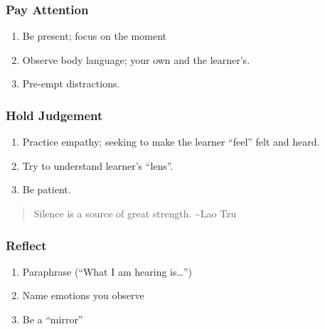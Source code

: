 \documentclass[
]{book}
\providecommand{\tightlist}{%
  \setlength{\itemsep}{0pt}\setlength{\parskip}{0pt}}
\begin{document}
\hypertarget{pay-attention}{%
\subsubsection*{Pay Attention}\label{pay-attention}}

\begin{enumerate}
\def\labelenumi{\arabic{enumi}.}
\tightlist
\item
  Be present; focus on the moment
\item
  Observe body language; your own and the learner's.
\item
  Pre-empt distractions.
\end{enumerate}

\hypertarget{hold-judgement}{%
\subsubsection*{Hold Judgement}\label{hold-judgement}}

\begin{enumerate}
\def\labelenumi{\arabic{enumi}.}
\tightlist
\item
  Practice empathy; seeking to make the learner ``feel'' felt and heard.
\item
  Try to understand learner's ``lens''.
\item
  Be patient.
\end{enumerate}

\begin{quote}
Silence is a source of great strength.
\textasciitilde Lao Tzu
\end{quote}

\hypertarget{reflect-1}{%
\subsubsection*{Reflect}\label{reflect-1}}

\begin{enumerate}
\def\labelenumi{\arabic{enumi}.}
\tightlist
\item
  Paraphrase (``What I am hearing is\ldots{}'')
\item
  Name emotions you observe
\item
  Be a ``mirror''
\end{enumerate}
\end{document}
